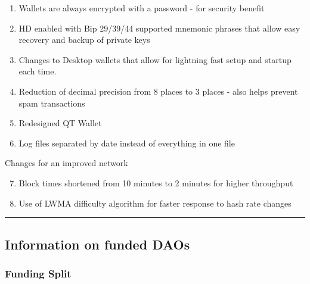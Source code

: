 \begin{enumerate}
\tightlist
\item
  {Wallets are always encrypted with a password - for security benefit}
\item
  {HD enabled with Bip 29/39/44 supported mnemonic phrases that allow
  easy recovery and backup of private keys}
\item
  {Changes to Desktop wallets that allow for lightning fast setup and
  startup each time.}
\item
  {Reduction of decimal precision from 8 places to 3 places - also helps
  prevent spam transactions}
\item
  {Redesigned QT Wallet}
\item
  {Log files separated by date instead of everything in one file}
\end{enumerate}

{}

{Changes for an improved network}

{}

\begin{enumerate}
\setcounter{enumi}{6}
\tightlist
\item
  {Block times shortened from 10 minutes to 2 minutes for higher
  throughput}
\item
  {Use of LWMA difficulty algorithm for faster response to hash rate
  changes}
\end{enumerate}

{}

{}

{}

{}

{}

\begin{center}\rule{0.5\linewidth}{\linethickness}\end{center}

{}

\hypertarget{h.93av7wuny8ba}{%
\subsection{\texorpdfstring{{I}{nformation on funded
DAOs}}{Information on funded DAOs}}\label{h.93av7wuny8ba}}

\hypertarget{h.2ihr2nor4ixs}{%
\subsubsection{\texorpdfstring{{Funding
Split}}{Funding Split}}\label{h.2ihr2nor4ixs}}

